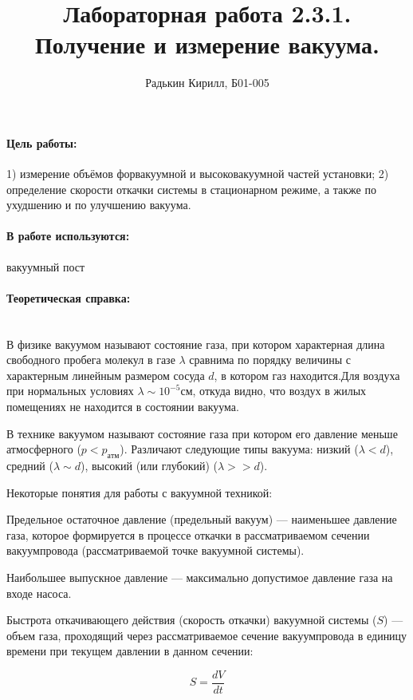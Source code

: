 \documentclass[12pt,a4paper]{article}
\author{Радькин Кирилл, Б01-005}
\title{Лабораторная работа 2.3.1. Получение и измерение вакуума.}
\begin{document}
	\maketitle
	
	\paragraph* {Цель работы:} 1) измерение объёмов форвакуумной и высоковакуумной частей установки; 2) определение скорости откачки системы в стационарном режиме, а также по ухудшению и по улучшению вакуума.

\paragraph* {В работе используются:} вакуумный пост

\paragraph* {Теоретическая справка:} ~\\

В физике вакуумом называют состояние газа, при котором характерная длина свободного пробега молекул в газе $\lambda$ сравнима по порядку величины с характерным линейным размером сосуда $d$, в котором газ находится.Для воздуха при нормальных условиях $\lambda \sim 10^{-5}см$, откуда видно, что воздух в жилых помещениях не находится в состоянии вакуума. 

В технике вакуумом называют состояние газа при котором его давление меньше атмосферного ($p < p_{атм}$). Различают следующие типы вакуума: низкий ($\lambda < d$), средний ($\lambda \sim d$), высокий (или глубокий) ($\lambda >> d$).

Некоторые понятия для работы с вакуумной техникой:

Предельное остаточное давление (предельный   вакуум) --- наименьшее давление газа, которое формируется в процессе откачки в рассматриваемом сечении вакуумпровода (рассматриваемой точке вакуумной системы).

Наибольшее выпускное давление --- максимально допустимое давление газа на входе насоса.

Быстрота  откачивающего  действия (скорость  откачки) вакуумной системы ($S$) --- объем газа, проходящий через рассматриваемое  сечение  вакуумпровода  в  единицу времени  при  текущем  давлении в данном сечении:

\[
    S = \frac{dV}{dt}
\]
\end{document}
